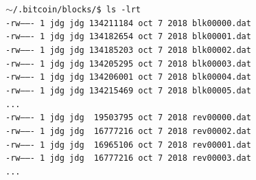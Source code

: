 \documentclass{article}
\begin{document}
    \begin{figure}[H]
    \scriptsize{\texttt{$\sim$/.bitcoin/blocks/\$ ls -lrt \\
-rw------- 1 jdg jdg 134211184 oct  7  2018 blk00000.dat \\
-rw------- 1 jdg jdg 134182654 oct  7  2018 blk00001.dat \\
-rw------- 1 jdg jdg 134185203 oct  7  2018 blk00002.dat \\
-rw------- 1 jdg jdg 134205295 oct  7  2018 blk00003.dat \\
-rw------- 1 jdg jdg 134206001 oct  7  2018 blk00004.dat \\
-rw------- 1 jdg jdg 134215469 oct  7  2018 blk00005.dat \\
... \\
-rw------- 1 jdg jdg \ 19503795 oct  7  2018 rev00000.dat \\
-rw------- 1 jdg jdg \ 16777216 oct  7  2018 rev00002.dat \\
-rw------- 1 jdg jdg \ 16965106 oct  7  2018 rev00001.dat \\
-rw------- 1 jdg jdg \ 16777216 oct  7  2018 rev00003.dat \\
...}
    }
    \end{figure}
    
\end{document}
